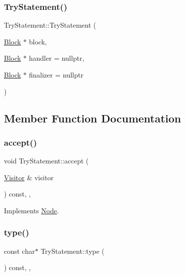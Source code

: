 \subsubsection{\texorpdfstring{Try\+Statement()}{TryStatement()}}
{\footnotesize\ttfamily Try\+Statement\+::\+Try\+Statement (\begin{DoxyParamCaption}\item[{\hyperlink{struct_block}{Block} $\ast$}]{block,  }\item[{\hyperlink{struct_block}{Block} $\ast$}]{handler = {\ttfamily nullptr},  }\item[{\hyperlink{struct_block}{Block} $\ast$}]{finalizer = {\ttfamily nullptr} }\end{DoxyParamCaption})\hspace{0.3cm}{\ttfamily [inline]}}



\subsection{Member Function Documentation}
\mbox{\label{struct_try_statement_af223e8205727843aa77651caeb89b805}} 
\subsubsection{\texorpdfstring{accept()}{accept()}}
{\footnotesize\ttfamily void Try\+Statement\+::accept (\begin{DoxyParamCaption}\item[{\hyperlink{struct_visitor}{Visitor} \&}]{visitor }\end{DoxyParamCaption}) const\hspace{0.3cm}{\ttfamily [inline]}, {\ttfamily [override]}, {\ttfamily [virtual]}}



Implements \hyperlink{struct_node_a10bd7af968140bbf5fa461298a969c71}{Node}.

\mbox{\label{struct_try_statement_a1113af03994575c6d5c0f814642f4503}} 
\subsubsection{\texorpdfstring{type()}{type()}}
{\footnotesize\ttfamily const char$\ast$ Try\+Statement\+::type (\begin{DoxyParamCaption}{ }\end{DoxyParamCaption}) const\hspace{0.3cm}{\ttfamily [inline]}, {\ttfamily [override]}, {\ttfamily [virtual]}}



